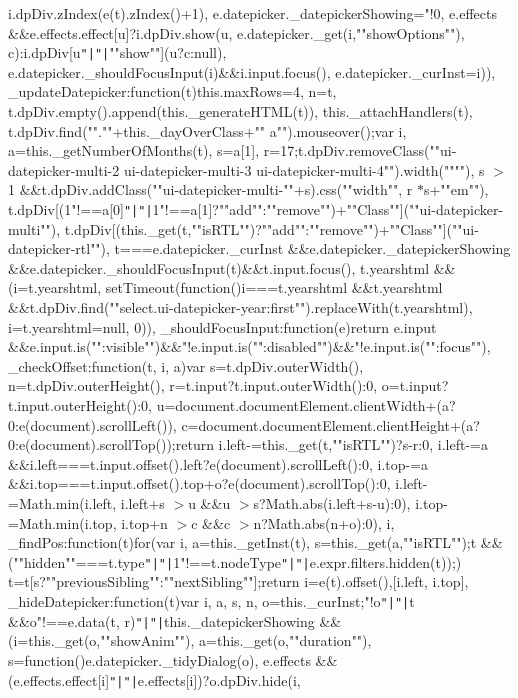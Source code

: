 i.\+dp\+Div.\+z\+Index(e(t).\+z\+Index()+1), e.\+datepicker.\+\_\+datepicker\+Showing="!0, e.\+effects \&\&e.\+effects.\+effect[u]?i.\+dp\+Div.\+show(u, e.\+datepicker.\+\_\+get(i,""show\+Options""), c)\+:i.\+dp\+Div[u\texttt{"|}\texttt{"|}""show""](u?c\+:null), e.\+datepicker.\+\_\+should\+Focus\+Input(i)\&\&i.\+input.\+focus(), e.\+datepicker.\+\_\+cur\+Inst=i))\rcurly{}\rcurly{}, \+\_\+update\+Datepicker\+:function(t)\lcurly{}this.\+max\+Rows=4, n=t, t.\+dp\+Div.\+empty().\+append(this.\+\_\+generate\+H\+T\+M\+L(t)), this.\+\_\+attach\+Handlers(t), t.\+dp\+Div.\+find("".""+this.\+\_\+day\+Over\+Class+"" a"").\+mouseover();var i, a=this.\+\_\+get\+Number\+Of\+Months(t), s=a[1], r=17;t.\+dp\+Div.\+remove\+Class(""ui-\/datepicker-\/multi-\/2 ui-\/datepicker-\/multi-\/3 ui-\/datepicker-\/multi-\/4"").\+width(""""), s $>$1 \&\&t.\+dp\+Div.\+add\+Class(""ui-\/datepicker-\/multi-\/""+s).\+css(""width"", r $\ast$s+""em""), t.\+dp\+Div[(1"!==a[0]\texttt{"|}\texttt{"|}1"!==a[1]?""add""\+:""remove"")+""Class""](""ui-\/datepicker-\/multi""), t.\+dp\+Div[(this.\+\_\+get(t,""is\+R\+TL"")?""add""\+:""remove"")+""Class""](""ui-\/datepicker-\/rtl""), t===e.\+datepicker.\+\_\+cur\+Inst \&\&e.\+datepicker.\+\_\+datepicker\+Showing \&\&e.\+datepicker.\+\_\+should\+Focus\+Input(t)\&\&t.\+input.\+focus(), t.\+yearshtml \&\&(i=t.\+yearshtml, set\+Timeout(function()\lcurly{}i===t.\+yearshtml \&\&t.\+yearshtml \&\&t.\+dp\+Div.\+find(""select.\+ui-\/datepicker-\/year\+:first"").\+replace\+With(t.\+yearshtml), i=t.\+yearshtml=null\rcurly{}, 0))\rcurly{}, \+\_\+should\+Focus\+Input\+:function(e)\lcurly{}return e.\+input \&\&e.\+input.\+is(""\+:visible"")\&\&"!e.\+input.\+is(""\+:disabled"")\&\&"!e.\+input.\+is(""\+:focus"")\rcurly{}, \+\_\+check\+Offset\+:function(t, i, a)\lcurly{}var s=t.\+dp\+Div.\+outer\+Width(), n=t.\+dp\+Div.\+outer\+Height(), r=t.\+input?t.\+input.\+outer\+Width()\+:0, o=t.\+input?t.\+input.\+outer\+Height()\+:0, u=document.\+document\+Element.\+client\+Width+(a?0\+:e(document).\+scroll\+Left()), c=document.\+document\+Element.\+client\+Height+(a?0\+:e(document).\+scroll\+Top());return i.\+left-\/=this.\+\_\+get(t,""is\+R\+TL"")?s-\/r\+:0, i.\+left-\/=a \&\&i.\+left===t.\+input.\+offset().\+left?e(document).\+scroll\+Left()\+:0, i.\+top-\/=a \&\&i.\+top===t.\+input.\+offset().\+top+o?e(document).\+scroll\+Top()\+:0, i.\+left-\/=\+Math.\+min(i.\+left, i.\+left+s $>$u \&\&u $>$s?\+Math.\+abs(i.\+left+s-\/u)\+:0), i.\+top-\/=\+Math.\+min(i.\+top, i.\+top+n $>$c \&\&c $>$n?\+Math.\+abs(n+o)\+:0), i\rcurly{}, \+\_\+find\+Pos\+:function(t)\lcurly{}for(var i, a=this.\+\_\+get\+Inst(t), s=this.\+\_\+get(a,""is\+R\+TL"");t \&\&(""hidden""===t.\+type\texttt{"|}\texttt{"|}1"!==t.\+node\+Type\texttt{"|}\texttt{"|}e.\+expr.\+filters.\+hidden(t));) t=t[s?""previous\+Sibling""\+:""next\+Sibling""];return i=e(t).\+offset(),[i.\+left, i.\+top]\rcurly{}, \+\_\+hide\+Datepicker\+:function(t)\lcurly{}var i, a, s, n, o=this.\+\_\+cur\+Inst;"!o\texttt{"|}\texttt{"|}t \&\&o"!==e.\+data(t, r)\texttt{"|}\texttt{"|}this.\+\_\+datepicker\+Showing \&\&(i=this.\+\_\+get(o,""show\+Anim""), a=this.\+\_\+get(o,""duration""), s=function()\lcurly{}e.\+datepicker.\+\_\+tidy\+Dialog(o)\rcurly{}, e.\+effects \&\&(e.\+effects.\+effect[i]\texttt{"|}\texttt{"|}e.\+effects[i])?o.\+dp\+Div.\+hide(i, 